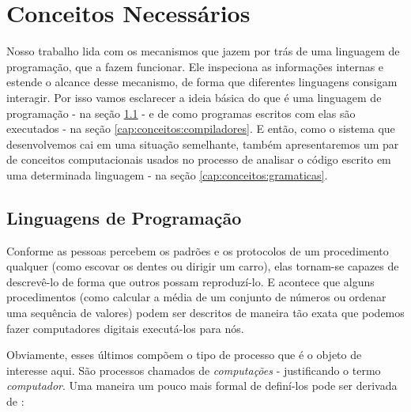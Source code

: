 
\chapter{Conceitos Necessários}
\label{cap:conceitos}

  Nosso trabalho lida com os mecanismos que jazem por trás de uma linguagem de
  programação, que a fazem funcionar. Ele inspeciona as informações internas e
  estende o alcance desse mecanismo, de forma que diferentes linguagens consigam
  interagir. Por isso vamos esclarecer a ideia básica do que é uma linguagem de
  programação - na seção \ref{cap:conceitos:linguagens} - e de como programas
  escritos com elas são executados - na seção \ref{cap:conceitos:compiladores}.
  E então, como o sistema que desenvolvemos cai em uma situação semelhante,
  também apresentaremos um par de conceitos computacionais usados no processo de
  analisar o código escrito em uma determinada linguagem - na seção
  \ref{cap:conceitos:gramaticas}.

  \section{Linguagens de Programação}
  \label{cap:conceitos:linguagens}

  Conforme as pessoas percebem os padrões e os protocolos de um procedimento
  qualquer (como escovar os dentes ou dirigir um carro), elas tornam-se capazes
  de descrevê-lo de forma que outros possam reproduzí-lo. E acontece que alguns
  procedimentos (como calcular a média de um conjunto de números ou ordenar uma
  sequência de valores) podem ser descritos de maneira tão exata que podemos
  fazer computadores digitais executá-los para nós.
  
  Obviamente, esses últimos compõem o tipo de processo que é o objeto de
  interesse aqui. São processos chamados de \emph{computações} - justificando o
  termo \emph{computador}. Uma maneira um pouco mais formal de definí-los pode
  ser derivada de \cite[Introduction]{pl:00}:



